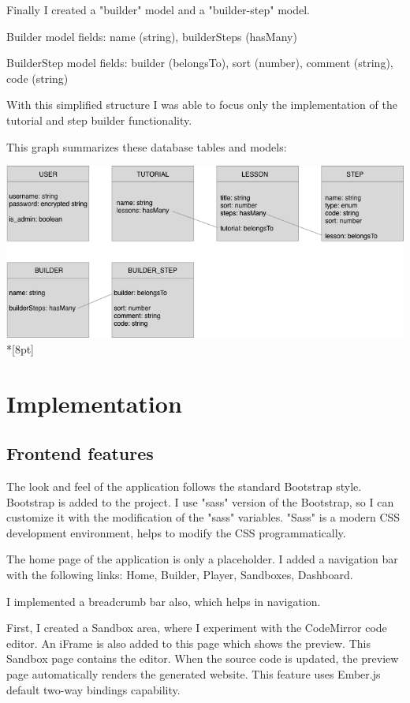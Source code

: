 \documentclass[12pt, a4paper, oneside, openright, medskipamount]{report}
\begin{document}
Finally I created a "builder" model and a "builder-step" model.

Builder model fields: name (string), builderSteps (hasMany)

BuilderStep model fields: builder (belongsTo), sort (number), comment (string), code (string)

With this simplified structure I was able to focus only the implementation of the tutorial and step builder functionality.

This graph summarizes these database tables and models:

\includegraphics[width=1\textwidth]{assets/database-tables}\\*[8pt]


\chapter{Implementation}

\section{Frontend features}

The look and feel of the application follows the standard Bootstrap style. Bootstrap is added to the project. I use "sass" version of the Bootstrap, so I can customize it with the modification of the "sass" variables. "Sass" is a modern CSS development environment, helps to modify the CSS programmatically.

The home page of the application is only a placeholder. I added a navigation bar with the following links: Home, Builder, Player, Sandboxes, Dashboard.

I implemented a breadcrumb bar also, which helps in navigation.

First, I created a Sandbox area, where I experiment with the CodeMirror code editor. An iFrame is also added to this page which shows the preview. This Sandbox page contains the editor. When the source code is updated, the preview page automatically renders the generated website. This feature uses Ember.js default two-way bindings capability.
\end{document}
